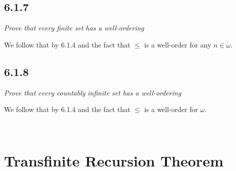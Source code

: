 \documentclass[11pt,oneside,titlepage]{book}
\begin{document}
\subsection*{6.1.7}

\textit{Prove that every finite set has a well-ordering}

We follow that by 6.1.4 and the fact that $\leq$ is a well-order
for any $n \in \omega$.

\subsection*{6.1.8}

\textit{Prove that every countably infinite set has a well-ordering}

We follow that by 6.1.4 and the fact that $\leq$ is a well-order
for $\omega$.

\

\section{Transfinite Recursion Theorem}
\end{document}
